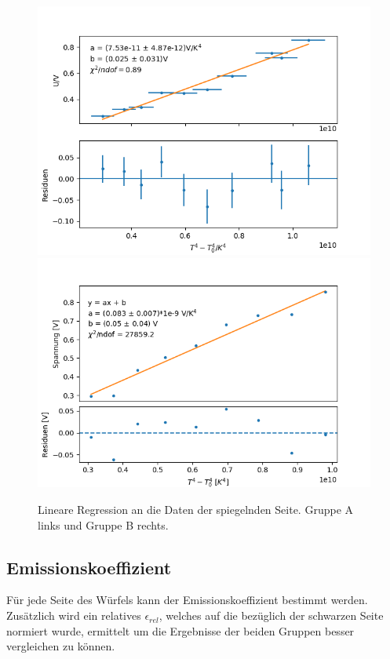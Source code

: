 \documentclass[12pt,a4paper]{article}
\begin{document}
\begin{figure}[H]
\centering
\includegraphics[scale=0.5]{Bilder/Spiegel_A}
\includegraphics[scale=0.5]{Bilder/spiegel_B}
\caption{Lineare Regression an die Daten der spiegelnden Seite. Gruppe A links und Gruppe B rechts.}
\label{fig:RegSpiegel}
\end{figure}




\subsection{Emissionskoeffizient}

Für jede Seite des Würfels kann der Emissionskoeffizient bestimmt werden. Zusätzlich wird ein relatives $\epsilon_{rel}$, welches auf die bezüglich der schwarzen Seite normiert wurde, ermittelt um die Ergebnisse der beiden Gruppen besser vergleichen zu können.
\end{document}
